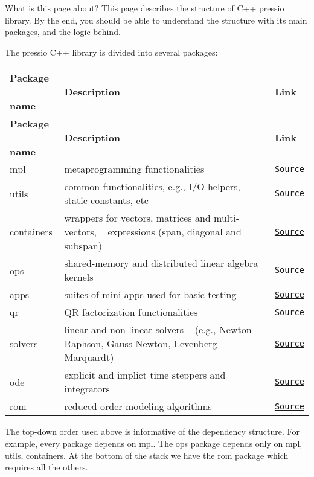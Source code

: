 

\begin{DoxyParagraph}{What is this page about?}
This page describes the structure of C++ pressio library. By the end, you should be able to understand the structure with its main packages, and the logic behind.
\end{DoxyParagraph}
The pressio C++ library is divided into several packages\+:

\tabulinesep=1mm
\begin{longtabu} spread 0pt [c]{*{3}{|X[-1]}|}
\hline
\rowcolor{\tableheadbgcolor}\textbf{ Package ~\newline
 name }&\textbf{ Description }&\textbf{ Link  }\\
\endfirsthead
\hline
\endfoot
\hline
\rowcolor{\tableheadbgcolor}\textbf{ Package ~\newline
 name }&\textbf{ Description }&\textbf{ Link  }\\
\endhead
mpl &metaprogramming functionalities &\href{https://github.com/Pressio/pressio/tree/master/packages/mpl/src}{\tt Source} \\
utils &common functionalities, e.\+g., I/O helpers, static constants, etc &\href{https://github.com/Pressio/pressio/tree/master/packages/utils/src}{\tt Source} \\
containers &wrappers for vectors, matrices and multi-\/vectors, ~\newline
 expressions (span, diagonal and subspan) &\href{https://github.com/Pressio/pressio/tree/master/packages/containers/src}{\tt Source} \\
ops &shared-\/memory and distributed linear algebra kernels &\href{https://github.com/Pressio/pressio/tree/master/packages/ops/src}{\tt Source} \\
apps &suites of mini-\/apps used for basic testing &\href{https://github.com/Pressio/pressio/tree/master/packages/apps/src}{\tt Source} \\
qr &QR factorization functionalities &\href{https://github.com/Pressio/pressio/tree/master/packages/qr/src}{\tt Source} \\
solvers &linear and non-\/linear solvers ~\newline
 (e.\+g., Newton-\/\+Raphson, Gauss-\/\+Newton, Levenberg-\/\+Marquardt) &\href{https://github.com/Pressio/pressio/tree/master/packages/solvers/src}{\tt Source} \\
ode &explicit and implict time steppers and integrators &\href{https://github.com/Pressio/pressio/tree/master/packages/ode/src}{\tt Source} \\
rom &reduced-\/order modeling algorithms &\href{https://github.com/Pressio/pressio/tree/master/packages/rom/src}{\tt Source} \\
\end{longtabu}
The top-\/down order used above is informative of the dependency structure. For example, every package depends on {\ttfamily mpl}. The {\ttfamily ops} package depends only on {\ttfamily mpl}, {\ttfamily utils}, {\ttfamily containers}. At the bottom of the stack we have the {\ttfamily rom} package which requires all the others.

